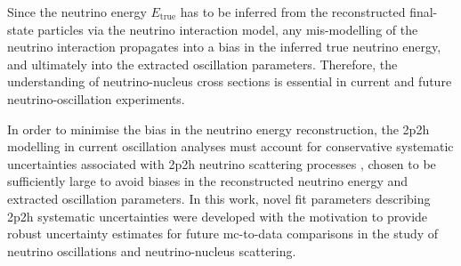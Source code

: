  
Since the neutrino energy $E_\text{true}$ has to be inferred from the reconstructed final-state particles via the neutrino interaction model, any mis-modelling of the neutrino interaction propagates into a bias in the inferred true neutrino energy, and ultimately into the extracted oscillation parameters. Therefore, the understanding of neutrino-nucleus cross sections is essential in current and future neutrino-oscillation experiments.

In order to minimise the bias in the neutrino energy reconstruction, the \acrshort{2p2h} modelling in current oscillation analyses must account for conservative systematic uncertainties associated with \acrshort{2p2h} neutrino scattering processes \cite{T2K:2017hed,NOvA:2018gge}, chosen to be sufficiently large to avoid biases in the reconstructed neutrino energy and extracted oscillation parameters.
In this work, novel fit parameters describing \acrshort{2p2h} systematic uncertainties were developed with the motivation to provide robust uncertainty estimates for future \acrshort{mc}-to-data comparisons in the study of neutrino oscillations and neutrino-nucleus scattering.

